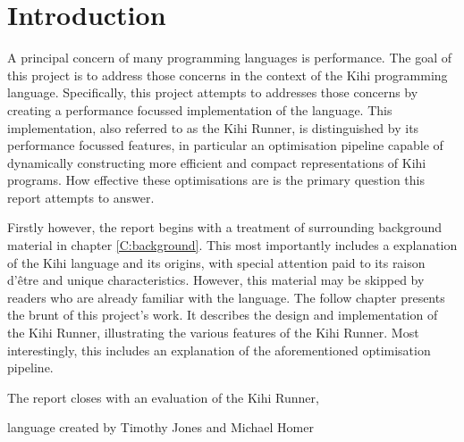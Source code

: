 \chapter{Introduction} \label{C:intro}
A principal concern of many programming languages is performance. The goal of this project is to address those concerns in the context of the Kihi programming language. Specifically, this project attempts to addresses those concerns by creating a performance focussed implementation of the language. This implementation, also referred to as the Kihi Runner, is distinguished by its performance focussed features, in particular an optimisation pipeline capable of dynamically constructing more efficient and compact representations of Kihi programs. How effective these optimisations are is the primary question this report attempts to answer.

Firstly however, the report begins with a treatment of surrounding background material in chapter \ref{C:background}. This most importantly includes a explanation of the Kihi language and its origins, with special attention paid to its raison d'être and unique characteristics. However, this material may be skipped by readers who are already familiar with the language. The follow chapter presents the brunt of this project's work. It describes the design and implementation of the Kihi Runner, illustrating the various features of the Kihi Runner. Most interestingly, this includes an explanation of the aforementioned optimisation pipeline. 

The report closes with an evaluation of the Kihi Runner,


language created by Timothy Jones and Michael Homer \cite{jones2018practice}